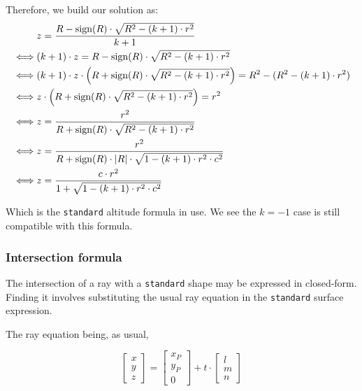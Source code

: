 Therefore, we build our solution as:
\begin{equation} \begin{split}
& z = \frac{R - \textrm{sign}(R) \cdot \sqrt{R^2 - (k+1) \cdot r^2}}{k+1} \\
\iff & (k+1) \cdot z = R - \textrm{sign}(R) \cdot \sqrt{R^2 - (k+1) \cdot r^2}\\
\iff & (k+1) \cdot z \cdot \left( R + \textrm{sign}(R) \cdot
       \sqrt{R^2 - (k+1) \cdot r^2} \right) = R^2 - (R^2 - (k+1) \cdot r^2) \\
\iff & z \cdot \left( R + \textrm{sign}(R) \cdot
       \sqrt{R^2 - (k+1) \cdot r^2} \right) = r^2 \\
\iff & z = \frac{r^2}{R + \textrm{sign}(R) \cdot \sqrt{R^2 - (k+1) \cdot r^2}}\\
\iff & z = \frac{r^2}{R + \textrm{sign}(R) \cdot \abs{R} \cdot
                      \sqrt{1 - (k+1) \cdot r^2 \cdot c^2}} \\
\iff & z = \frac{c \cdot r^2}{1 + \sqrt{1 - (k+1) \cdot r^2 \cdot c^2}}
\end{split} \end{equation}

Which is the \lstinline{standard} altitude formula in use. We see the $k=-1$
case is still compatible with this formula.

\subsubsection{Intersection formula}
The intersection of a ray with a \lstinline{standard} shape may be expressed
in closed-form. Finding it involves substituting the usual ray equation in
the \lstinline{standard} surface expression.

The ray equation being, as usual,

\begin{equation}
\begin{bmatrix} x \\ y \\ z \end{bmatrix} =
\begin{bmatrix} x_P \\ y_P \\ 0 \end{bmatrix} + t \cdot
\begin{bmatrix} l \\ m \\ n \end{bmatrix}
\end{equation}

